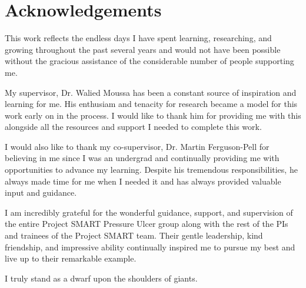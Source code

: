 \onehalfspacing
\chapter*{Acknowledgements}
	This work reflects the endless days I have spent learning, researching, and growing throughout the past several years and would not have been possible without the gracious assistance of the considerable number of people supporting me.

	My supervisor, Dr. Walied Moussa has been a constant source of inspiration and learning for me. His enthusiam and tenacity for research became a model for this work early on in the process. I would like to thank him for providing me with this alongside all the resources and support I needed to complete this work.

	I would also like to thank my co-supervisor, Dr. Martin Ferguson-Pell for believing in me since I was an undergrad and continually providing me with opportunities to advance my learning. Despite his tremendous responsibilities, he always made time for me when I needed it and has always provided valuable input and guidance.

	I am incredibly grateful for the wonderful guidance, support, and supervision of the entire Project SMART Pressure Ulcer group along with the rest of the PIs and trainees of the Project SMART team. Their gentle leadership, kind friendship, and impressive ability continually inspired me to pursue my best and live up to their remarkable example.


	I truly stand as a dwarf upon the shoulders of giants.